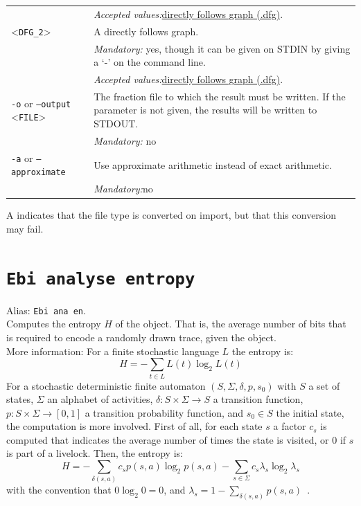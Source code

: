 {\begin{tabularx}{\linewidth}{lX}
&\textit{Accepted values:}\quad \hyperref[filehandler:directly follows graph]{directly follows graph (.dfg)}.\\
<\texttt{DFG\_2}>&A directly follows graph.\\
&\textit{Mandatory:} \quad yes, though it can be given on STDIN by giving a `-' on the command line.\\
&\textit{Accepted values:}\quad \hyperref[filehandler:directly follows graph]{directly follows graph (.dfg)}.\\
\texttt{-o} or \texttt{--output} <\texttt{FILE}> &
The fraction file to which the result must be written. If the parameter is not given, the results will be written to STDOUT.\\
&\textit{Mandatory:} \quad no\\
\texttt{-a} or \texttt{--approximate} & Use approximate arithmetic instead of exact arithmetic.\\
&\textit{Mandatory:}\quad no\\
\bottomrule
\end{tabularx}
A \textdagger{} indicates that the file type is converted on import, but that this conversion may fail.
\clearpage\section{\texttt{Ebi analyse entropy}}
\label{command:Ebi analyse entropy}
Alias: \texttt{Ebi ana en}.\\
Computes the entropy $H$ of the object. That is, the average number of bits that is required to encode a randomly drawn trace, given the object.\\
More information: For a finite stochastic language $L$ the entropy is:
    $$ H = - \sum_{t \in L} L(t) \log_2 L(t) $$
    For a stochastic deterministic finite automaton $(S, \Sigma, \delta, p, s_0)$ with 
    $S$ a set of states, 
    $\Sigma$ an alphabet of activities, 
    $\delta \colon S \times \Sigma \rightarrow S$ a transition function,
    $p \colon S \times \Sigma \rightarrow [0, 1]$ a transition probability function, and 
    $s_0 \in S$ the initial state, the computation is more involved.
    First of all, for each state $s$ a factor $c_s$ is computed that indicates the average number of times the state is visited, or 0 if $s$ is part of a livelock.
    Then, the entropy is:
    $$ H = -\sum_{\delta(s, a)} c_s p(s, a) \log_2 p(s, a) - \sum_{s \in \Sigma} c_s \lambda_s \log_2 \lambda_s $$
    with the convention that $0 \log_2 0 = 0$, and $\lambda_s = 1 - \sum_{\delta(s, a)} p(s, a)$~\cite{DBLP:journals/is/LeemansP23}.~\\
}
